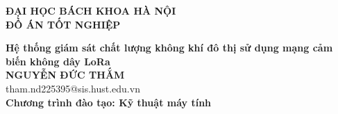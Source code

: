 \documentclass[DoAn.tex]{subfiles}
\begin{document}
\begin{titlepage}
\thispagestyle{empty}
\begin{center}

{\textbf{\large{ĐẠI HỌC BÁCH KHOA HÀ NỘI}}}\\[4cm]

{\textbf{\huge{ ĐỒ ÁN TỐT NGHIỆP}}}\\[1cm]
{\textbf{\Large{Hệ thống giám sát chất lượng không khí đô thị sử dụng mạng cảm biến không dây LoRa}}\\[0.5cm]

{\textbf{\large{NGUYỄN ĐỨC THẮM}}}\\
{\large{tham.nd225395@sis.hust.edu.vn}}\\[0.5cm]

{\textbf{\large{Chương trình đào tạo: Kỹ thuật máy tính
}}}\\

\vspace{4cm}
\begin{table}[H]
\centering
{}
\end{table}}
\end{center}



\end{titlepage}
\end{document}
